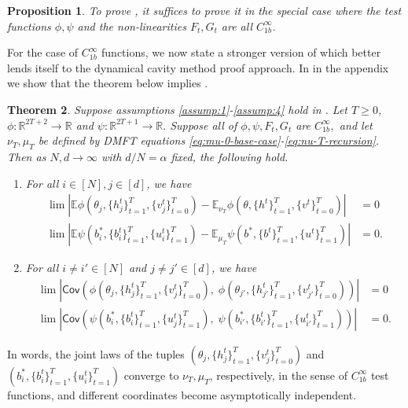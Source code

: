 \documentclass{article}
\newcommand{\1}{\mathbbm{1}}
\theoremstyle{plain}
\newtheorem{theorem}{Theorem}[section]
\newtheorem{proposition}[theorem]{Proposition}
\theoremstyle{definition}
\theoremstyle{remark}
\newcommand{\E}{\mathbb{E}}
\newcommand{\Cov}{\mathsf{Cov}}
\newcommand{\R}{\mathbb{R}}
\begin{document}
\begin{proposition}\label{prop:smooth-approximation}
    To prove , it suffices to prove it in the special case where the test functions $\phi,\psi$ and the non-linearities $F_t,G_t$ are all $C^\infty_{1b}.$
\end{proposition}
For the case of $C^\infty_{1b}$ functions, we now state a stronger version of  which better lends itself to the dynamical cavity method proof approach. In  in the appendix we show that the theorem below implies .
\begin{theorem}\label{thm:main-strong}
    Suppose assumptions \eqref{assump:1}-\eqref{assump:4} hold in . Let $T\geq 0$, $\phi:\R^{2T+2}\to \R$ and $\psi:\R^{2T+1}\to\R.$ Suppose all of $\phi,\psi,F_t,G_t$ are $C^\infty_{1b},$ and let $\nu_T,\mu_T$ be defined by DMFT equations \eqref{eq:mu-0-base-case}-\eqref{eq:nu-T-recursion}. Then as $N,d\to\infty$ with $d/N=\alpha$ fixed, the following hold.
    \begin{enumerate}
        \item For all $i\in [N],j\in [d]$, we have
        \begin{align}
            \lim |\E \phi(\theta_j, \{h_j^t\}_{t=1}^T, \{v_j^t\}_{t=0}^T) - \E_{\nu_T} \phi(\theta, \{h^t\}_{t=1}^T, \{v^t\}_{t=0}^T)| &= 0 \\
            \lim |\E \psi(b_i^*, \{b_i^t\}_{t=1}^T, \{u_i^t\}_{t=1}^T) - \E_{\mu_T} \psi(b^*, \{b^t\}_{t=1}^T, \{u^t\}_{t=1}^T)| &= 0.
        \end{align}
        \item For all $i\neq i' \in [N]$ and $j\neq j'\in [d]$, we have
        \begin{align}
            \lim  \left|\Cov\left( \phi(\theta_j, \{h_j^t\}_{t=1}^T, \{v_j^t\}_{t=0}^T),\; \phi(\theta_{j'}, \{h_{j'}^t\}_{t=1}^T, \{v_{j'}^t\}_{t=0}^T)\right)\right| &= 0 \\
            \lim  \left|\Cov\left( \psi(b_i^*, \{b_i^t\}_{t=1}^T, \{u_j^t\}_{t=1}^T),\; \psi(b_{i'}^*, \{b_{i'}^t\}_{t=1}^T, \{u_{i'}^t\}_{t=1}^T)\right)\right| &= 0.
        \end{align}
    \end{enumerate}
\end{theorem}
In words, the joint laws of the tuples $(\theta_j, \{h_j^t\}_{t=1}^T, \{v_j^t\}_{t=0}^T)$ and $(b_i^*, \{b_i^t\}_{t=1}^T, \{u_i^t\}_{t=1}^T)$ converge to $\nu_T,\mu_T$, respectively, in the sense of $C^\infty_{1b}$ test functions, and different coordinates become asymptotically independent.
\end{document}
